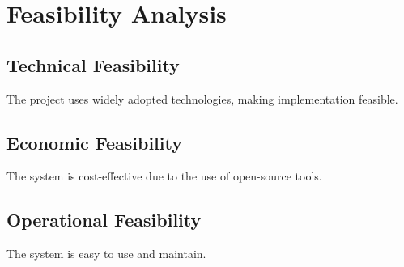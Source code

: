 \section{Feasibility Analysis}

\subsection{Technical Feasibility}
The project uses widely adopted technologies, making implementation feasible.

\subsection{Economic Feasibility}
The system is cost-effective due to the use of open-source tools.

\subsection{Operational Feasibility}
The system is easy to use and maintain.